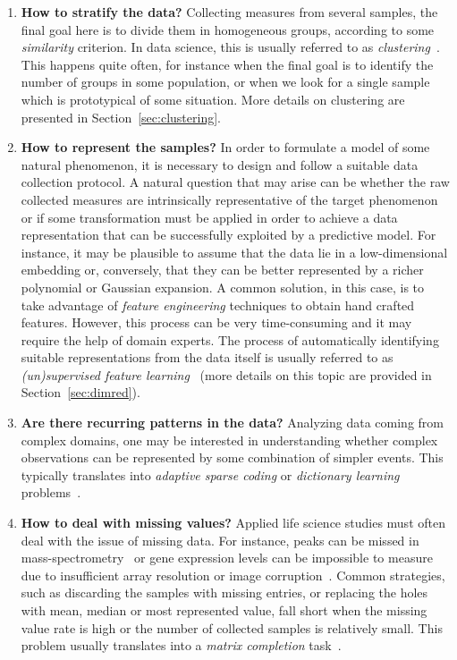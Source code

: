 \begin{enumerate}
	\item[] \textbf{How to stratify the data?}
	Collecting measures from several samples, the final goal here is to divide them in homogeneous groups, according to some \textit{similarity} criterion. In data science, this is usually referred to as \textit{clustering}~\cite{hastie2009elements}.
	This happens quite often, for instance when the final goal is to identify the number of groups in some population, or when we look for a single sample which is prototypical of some situation. More details on clustering are presented in Section~\ref{sec:clustering}.
	
	\item[] \textbf{How to represent the samples?}
	In order to formulate a model of some natural phenomenon, it is necessary to design and follow a suitable data collection protocol. A natural question that may arise can be whether the raw collected measures are intrinsically representative of the target phenomenon or if some transformation must be applied in order to achieve a data representation that can be successfully exploited by a predictive model. For instance, it may be plausible to assume that the data lie in a low-dimensional embedding or, conversely, that they can be better represented by a richer polynomial or Gaussian expansion.
	A common solution, in this case, is to take advantage of \textit{feature engineering} techniques to obtain hand crafted features. However, this process can be very time-consuming and it may require the help of domain experts. The process of automatically identifying suitable representations from the data itself is usually referred to as \textit{(un)supervised feature learning}~\cite{angermueller2016deep, mamoshina2016applications} (more details on this topic are provided in Section~\ref{sec:dimred}).
	
	
	\item[] \textbf{Are there recurring patterns in the data?}
	Analyzing data coming from complex domains, one may be interested in understanding whether complex observations can be represented by some combination of simpler events. This typically translates into \textit{adaptive sparse coding} or \textit{dictionary learning} problems~\cite{masecchia2015genome, alexandrov2013signatures, nowak2011fused}.
	
	
	\item[] \textbf{How to deal with missing values?}
	Applied life science studies must often deal with the issue of missing data. For instance, peaks can be missed in mass-spectrometry~\cite{jung2014adaption} or gene expression levels can be impossible to measure due to insufficient array resolution or image corruption~\cite{stekhoven2011missforest, troyanskaya2001missing}. Common strategies, such as discarding the samples with missing entries, or replacing the holes with mean, median or most represented value, fall short when the missing value rate is high or the number of collected samples is relatively small. This problem usually translates into a \textit{matrix completion} task~\cite{candes2009exact}.
	
\end{enumerate}


